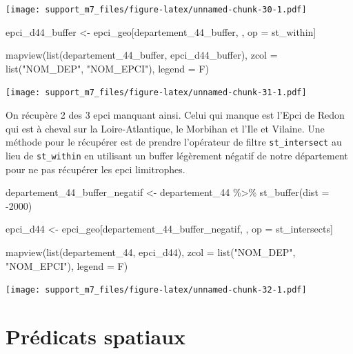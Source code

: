\documentclass[
]{book}
\newenvironment{Shaded}{\begin{snugshade}}{\end{snugshade}}
\newcommand{\AttributeTok}[1]{\textcolor[rgb]{0.77,0.63,0.00}{#1}}
\newcommand{\DecValTok}[1]{\textcolor[rgb]{0.00,0.00,0.81}{#1}}
\newcommand{\FunctionTok}[1]{\textcolor[rgb]{0.00,0.00,0.00}{#1}}
\newcommand{\NormalTok}[1]{#1}
\newcommand{\OtherTok}[1]{\textcolor[rgb]{0.56,0.35,0.01}{#1}}
\newcommand{\SpecialCharTok}[1]{\textcolor[rgb]{0.00,0.00,0.00}{#1}}
\newcommand{\StringTok}[1]{\textcolor[rgb]{0.31,0.60,0.02}{#1}}
\begin{document}
\texttt{[image: support\_m7\_files/figure-latex/unnamed-chunk-30-1.pdf]}

\begin{Shaded}
\begin{Highlighting}[]
\NormalTok{epci\_d44\_buffer }\OtherTok{\textless{}{-}}\NormalTok{ epci\_geo[departement\_44\_buffer, , op }\OtherTok{=}\NormalTok{ st\_within]}

\FunctionTok{mapview}\NormalTok{(}\FunctionTok{list}\NormalTok{(departement\_44\_buffer, epci\_d44\_buffer), }\AttributeTok{zcol =} \FunctionTok{list}\NormalTok{(}\StringTok{"NOM\_DEP"}\NormalTok{, }\StringTok{"NOM\_EPCI"}\NormalTok{), }\AttributeTok{legend =}\NormalTok{ F)}
\end{Highlighting}
\end{Shaded}

\texttt{[image: support\_m7\_files/figure-latex/unnamed-chunk-31-1.pdf]}

On récupère 2 des 3 epci manquant ainsi. Celui qui manque est l'Epci de Redon qui est à cheval sur la Loire-Atlantique, le Morbihan et l'Ile et Vilaine.
Une méthode pour le récupérer est de prendre l'opérateur de filtre \texttt{st\_intersect} au lieu de \texttt{st\_within} en utilisant un buffer légèrement négatif de notre département pour ne pas récupérer les epci limitrophes.

\begin{Shaded}
\begin{Highlighting}[]
\NormalTok{departement\_44\_buffer\_negatif }\OtherTok{\textless{}{-}}\NormalTok{ departement\_44 }\SpecialCharTok{\%\textgreater{}\%}
  \FunctionTok{st\_buffer}\NormalTok{(}\AttributeTok{dist =} \SpecialCharTok{{-}}\DecValTok{2000}\NormalTok{)}

\NormalTok{epci\_d44 }\OtherTok{\textless{}{-}}\NormalTok{ epci\_geo[departement\_44\_buffer\_negatif, , op }\OtherTok{=}\NormalTok{ st\_intersects]}

\FunctionTok{mapview}\NormalTok{(}\FunctionTok{list}\NormalTok{(departement\_44, epci\_d44), }\AttributeTok{zcol =} \FunctionTok{list}\NormalTok{(}\StringTok{"NOM\_DEP"}\NormalTok{, }\StringTok{"NOM\_EPCI"}\NormalTok{), }\AttributeTok{legend =}\NormalTok{ F)}
\end{Highlighting}
\end{Shaded}

\texttt{[image: support\_m7\_files/figure-latex/unnamed-chunk-32-1.pdf]}

\hypertarget{pruxe9dicats-spatiaux}{%
\section{Prédicats spatiaux}\label{pruxe9dicats-spatiaux}}
\end{document}
